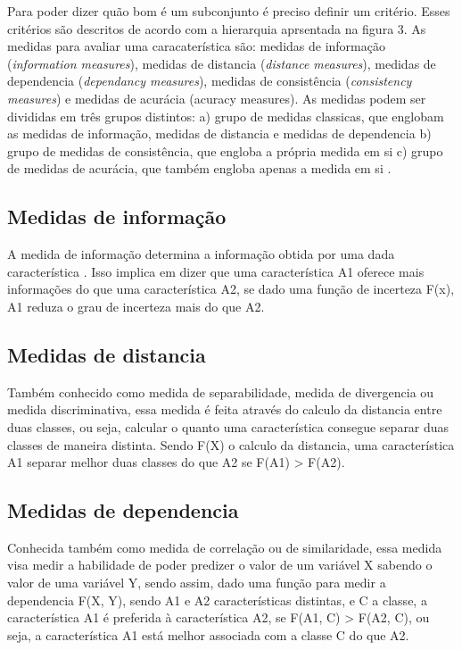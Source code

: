 Para poder dizer quão bom é um subconjunto é preciso definir um critério. Esses critérios são descritos de acordo com a hierarquia aprsentada na figura 3. As medidas para avaliar uma caracaterística são: medidas de informação (\textit{information measures}), medidas de distancia (\textit{distance measures}), medidas de dependencia (\textit{dependancy measures}), medidas de consistência (\textit{consistency measures}) e medidas de acurácia ({acuracy measures}). \cite{liu_2005, huan_1998} As medidas podem ser divididas em três grupos distintos: a) grupo de medidas classicas, que englobam as medidas de informação, medidas de distancia e medidas de dependencia b) grupo de medidas de consistência, que engloba a própria medida em si c) grupo de medidas de acurácia, que também engloba apenas a medida em si \cite{huan_1998}.

\subsection{Medidas de informação}

A medida de informação determina a informação obtida por uma dada característica \cite{liu_2005}. Isso implica em dizer que uma característica A1 oferece mais informações do que uma característica A2, se dado uma função de incerteza F(x), A1 reduza o grau de incerteza mais do que A2.

\subsection{Medidas de distancia}

Também conhecido como medida de separabilidade, medida de divergencia ou medida discriminativa, essa medida é feita através do calculo da distancia entre duas classes, ou seja, calcular o quanto uma característica consegue  separar duas classes de maneira distinta. Sendo F(X) o calculo da distancia, uma característica A1 separar melhor duas classes do que A2 se F(A1) > F(A2). \cite{huan_1998}

\subsection{Medidas de dependencia}

Conhecida também como medida de correlação ou de similaridade, essa medida visa medir a habilidade de poder predizer o valor de um variável X sabendo o valor de uma variável Y, sendo assim, dado uma função para medir a dependencia F(X, Y), sendo A1 e A2 características distintas, e C a classe, a característica A1 é preferida à característica A2, se F(A1, C) > F(A2, C), ou seja, a característica A1 está melhor associada com a classe C do que A2. \cite{huan_1998, liu_2005}

